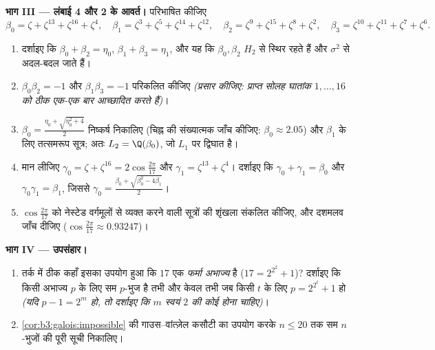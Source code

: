 \begin{problem}
\medskip
\noindent\textbf{भाग III --- लंबाई 4 और 2 के आवर्त।} परिभाषित
कीजिए
\[
\beta_0 = \zeta + \zeta^{13} + \zeta^{16} + \zeta^{4},\quad
\beta_1 = \zeta^3 + \zeta^5 + \zeta^{14} + \zeta^{12},\quad
\beta_2 = \zeta^9 + \zeta^{15} + \zeta^{8} + \zeta^{2},\quad
\beta_3 = \zeta^{10} + \zeta^{11} + \zeta^{7} + \zeta^{6}.
\]
\begin{enumerate}[resume]
  \item दर्शाइए कि $\beta_0 + \beta_2 = \eta_0$, $\beta_1 + \beta_3 =
        \eta_1$, और यह कि $\beta_0, \beta_2$ $H_2$ से
        स्थिर रहते हैं और $\sigma^2$ से अदल-बदल जाते हैं।
  \item $\beta_0\beta_2 = -1$ और $\beta_1\beta_3 = -1$ परिकलित कीजिए \emph{(प्रसार कीजिए:
        प्राप्त सोलह घातांक $1, \dots, 16$ को ठीक एक-एक बार आच्छादित
        करते हैं)}।
  \item $\beta_0 = \frac{\eta_0 + \sqrt{\eta_0^2 + 4}}2$ निष्कर्ष निकालिए (चिह्न की संख्यात्मक जाँच कीजिए:
        $\beta_0 \approx 2.05$) और $\beta_1$ के लिए तत्समरूप सूत्र; अतः $L_2 =
        \Q(\beta_0)$, जो
        $L_1$ पर द्विघात है।
  \item मान लीजिए $\gamma_0 = \zeta + \zeta^{16} =
        2\cos\frac{2\pi}{17}$ और $\gamma_1 = \zeta^{13} +
        \zeta^4$। दर्शाइए कि $\gamma_0 + \gamma_1 = \beta_0$ और $\gamma_0\gamma_1 = \beta_1$,
        जिससे $\gamma_0 =
        \frac{\beta_0 + \sqrt{\beta_0^2 - 4\beta_1}}2$।
  \item $\cos\frac{2\pi}{17}$ को नेस्टेड वर्गमूलों से व्यक्त करने वाली सूत्रों
        की शृंखला संकलित कीजिए, और दशमलव जाँच दीजिए ($\cos\frac{2\pi}{17} \approx 0.93247$)।
\end{enumerate}

\medskip
\noindent\textbf{भाग IV --- उपसंहार।}
\begin{enumerate}[resume]
  \item तर्क में ठीक कहाँ इसका उपयोग हुआ कि $17$ एक \emph{फर्मा
        अभाज्य} है ($17 = 2^{2^2} + 1$)? दर्शाइए कि किसी अभाज्य $p$ के
        लिए सम $p$-भुज  है तभी और केवल तभी जब किसी
        $t$ के लिए $p
        = 2^{2^t} + 1$ हो \emph{(यदि $p - 1 = 2^m$ हो, तो दर्शाइए
        कि $m$ स्वयं $2$ की कोई  होना चाहिए)}।
  \item \cref{cor:b3:galois:impossible} की गाउस--वांत्ज़ेल कसौटी का उपयोग करके $n \leq 20$ तक
         सम $n$-भुजों की पूरी सूची निकालिए।
\end{enumerate}


\end{problem}
